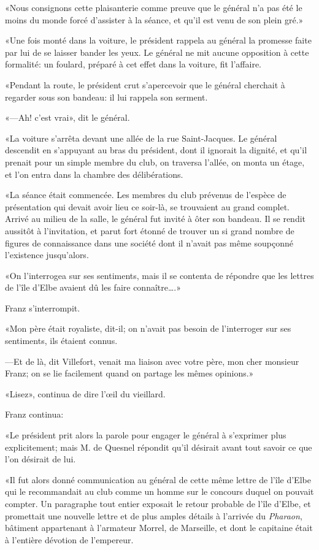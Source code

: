 «Nous consignons cette plaisanterie comme preuve que le général n'a pas été le moins du monde forcé d'assister à la séance, et qu'il est venu de son plein gré.» 

«Une fois monté dans la voiture, le président rappela au général la promesse faite par lui de se laisser bander les yeux. Le général ne mit aucune opposition à cette formalité: un foulard, préparé à cet effet dans la voiture, fit l'affaire. 

«Pendant la route, le président crut s'apercevoir que le général cherchait à regarder sous son bandeau: il lui rappela son serment. 

«—Ah! c'est vrai», dit le général. 

«La voiture s'arrêta devant une allée de la rue Saint-Jacques. Le général descendit en s'appuyant au bras du président, dont il ignorait la dignité, et qu'il prenait pour un simple membre du club, on traversa l'allée, on monta un étage, et l'on entra dans la chambre des délibérations. 

«La séance était commencée. Les membres du club prévenus de l'espèce de présentation qui devait avoir lieu ce soir-là, se trouvaient au grand complet. Arrivé au milieu de la salle, le général fut invité à ôter son bandeau. Il se rendit aussitôt à l'invitation, et parut fort étonné de trouver un si grand nombre de figures de connaissance dans une société dont il n'avait pas même soupçonné l'existence jusqu'alors. 

«On l'interrogea sur ses sentiments, mais il se contenta de répondre que les lettres de l'île d'Elbe avaient dû les faire connaître\dots.» 

Franz s'interrompit. 

«Mon père était royaliste, dit-il; on n'avait pas besoin de l'interroger sur ses sentiments, ils étaient connus.  

—Et de là, dit Villefort, venait ma liaison avec votre père, mon cher monsieur Franz; on se lie facilement quand on partage les mêmes opinions.» 

«Lisez», continua de dire l'œil du vieillard. 

Franz continua: 

«Le président prit alors la parole pour engager le général à s'exprimer plus explicitement; mais M. de Quesnel répondit qu'il désirait avant tout savoir ce que l'on désirait de lui. 

«Il fut alors donné communication au général de cette même lettre de l'île d'Elbe qui le recommandait au club comme un homme sur le concours duquel on pouvait compter. Un paragraphe tout entier exposait le retour probable de l'île d'Elbe, et promettait une nouvelle lettre et de plus amples détails à l'arrivée du \textit{Pharaon}, bâtiment appartenant à l'armateur Morrel, de Marseille, et dont le capitaine était à l'entière dévotion de l'empereur. 

